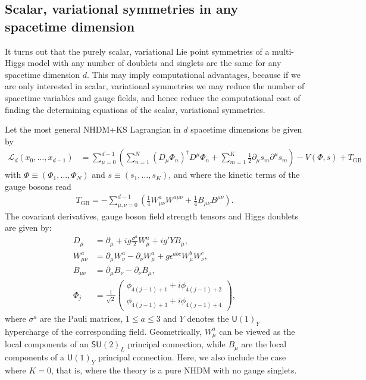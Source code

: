 \documentclass[a4paper,hidelinks, 12pt]{article}
\numberwithin{equation}{section}
\theoremstyle{plain}
\newcommand{\Lg}{\mathsf}
\newcommand{\mc}{\mathcal}
\begin{document}
\subsection{Scalar, variational symmetries in any spacetime dimension}
\label{sec:TheScalarSymmetriesAreTheSameInAnySpacetimeDimension}
It turns out that the purely scalar, variational Lie point symmetries of a multi-Higgs model with any number of doublets and singlets are the same for any spacetime dimension $d$. This may imply computational advantages, because if we are only interested in scalar, variational symmetries we may reduce the number of spacetime variables and gauge fields, and hence 
reduce the computational cost of finding the determining equations of the scalar, variational symmetries.  

Let the most general NHDM+KS Lagrangian in $d$ spacetime dimensions be given by
\begin{align}\label{E:L_NHDM+KS}
	\mc{L}_d(x_0,\ldots,x_{d-1})&=\sum_{\mu=0}^{d-1} \left( \sum_{n=1}^N(D_\mu \Phi_n)^\dag D^\mu \Phi_n+ \sum_{m=1}^K\frac{1}{2}\partial_\mu s_m\partial^\mu s_m\right) -V(\Phi,s) +T_\text{GB}
	\end{align} 
	with $\Phi\equiv (\Phi_1,\ldots,\Phi_N)$ and $s\equiv (s_1,\ldots,s_K)$, and
	where the kinetic terms of the gauge bosons read
	\begin{align}\label{E:TGB}
T_\text{GB}	= -\sum_{\mu, \nu=0}^{d-1} \left( \tfrac{1}{4}W^a_{\mu\nu}W^{a\mu\nu}
  +\tfrac{1}{4}B_{\mu\nu}B^{\mu\nu}\right).		
	\end{align}
The covariant derivatives, gauge boson field strength tensors and Higgs doublets are given by:
\begin{align}
D_\mu &= \partial_\mu + i g \frac{\sigma^a}{2} W^a_\mu + i g' Y B_\mu, \label{E:covarDerDef} \\
W^a_{\mu\nu} &= \partial_\mu W^a_\nu - \partial_\nu W^a_\mu + g \epsilon^{abc}W^b_\mu W^c_\nu, \label{E:Wfst}\\
B_{\mu\nu} &= \partial_\mu B_\nu - \partial_\nu B_\mu, \label{E:Bfst} \\
\Phi_j &= \frac{1}{\sqrt{2}}
\begin{pmatrix}
\phi_{4(j-1)+1} + i \phi_{4(j-1)+2} \\
\phi_{4(j-1)+3} + i \phi_{4(j-1)+4}
\end{pmatrix}, \label{E:HiggsDoubletsNHDM}
\end{align}
 where $\sigma^a$ are the Pauli matrices, $1\leq a \leq 3$ and $Y$ denotes the
$\Lg{U}(1)_Y$ hypercharge of the corresponding field. Geometrically,
$W^a_\mu$ can be viewed as the local components of an $\Lg{SU}(2)_L$
principal connection, while $B_\mu$ are the local components of a
$\Lg{U}(1)_Y$ principal connection.
Here, we also include the case where $K=0$,
that is, where the theory is a pure NHDM with no gauge singlets.
\end{document}
